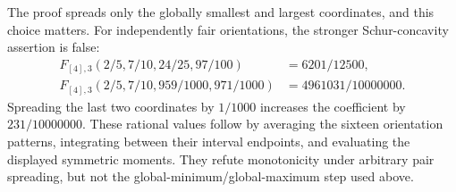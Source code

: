 The proof spreads only the globally smallest and largest coordinates, and
this choice matters. For independently fair
orientations, the stronger Schur-concavity assertion is false:
\begin{equation}\label{eq:schur-counterexample}
 \begin{split}
 F_{[4],3}(2/5,7/10,24/25,97/100)&=6201/12500,\\
 F_{[4],3}(2/5,7/10,959/1000,971/1000)&=4961031/10000000.
 \end{split}
\end{equation}
Spreading the last two coordinates by $1/1000$ increases the coefficient
by $231/10000000$. These rational values follow by averaging the sixteen
orientation patterns, integrating between their interval endpoints,
and evaluating the displayed symmetric moments. They refute monotonicity
under arbitrary pair spreading, but not the global-minimum/global-maximum
step used above.

